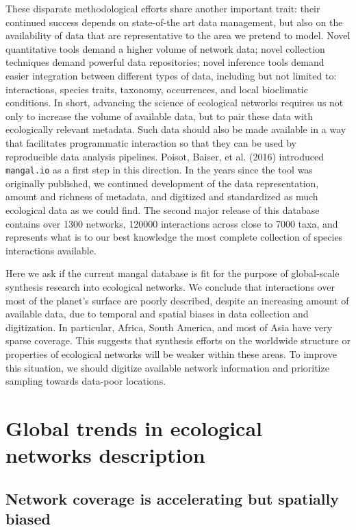 \documentclass[11pt]{article}
\begin{document}
These disparate methodological efforts share another important trait:
their continued success depends on state-of-the art data management, but
also on the availability of data that are representative to the area we
pretend to model. Novel quantitative tools demand a higher volume of
network data; novel collection techniques demand powerful data
repositories; novel inference tools demand easier integration between
different types of data, including but not limited to: interactions,
species traits, taxonomy, occurrences, and local bioclimatic conditions.
In short, advancing the science of ecological networks requires us not
only to increase the volume of available data, but to pair these data
with ecologically relevant metadata. Such data should also be made
available in a way that facilitates programmatic interaction so that
they can be used by reproducible data analysis pipelines. Poisot,
Baiser, et al. (2016) introduced \texttt{mangal.io} as a first step in
this direction. In the years since the tool was originally published, we
continued development of the data representation, amount and richness of
metadata, and digitized and standardized as much ecological data as we
could find. The second major release of this database contains over 1300
networks, 120000 interactions across close to 7000 taxa, and represents
what is to our best knowledge the most complete collection of species
interactions available.

Here we ask if the current mangal database is fit for the purpose of
global-scale synthesis research into ecological networks. We conclude
that interactions over most of the planet's surface are poorly
described, despite an increasing amount of available data, due to
temporal and spatial biases in data collection and digitization. In
particular, Africa, South America, and most of Asia have very sparse
coverage. This suggests that synthesis efforts on the worldwide
structure or properties of ecological networks will be weaker within
these areas. To improve this situation, we should digitize available
network information and prioritize sampling towards data-poor locations.

\hypertarget{global-trends-in-ecological-networks-description}{%
\section{Global trends in ecological networks
description}\label{global-trends-in-ecological-networks-description}}

\hypertarget{network-coverage-is-accelerating-but-spatially-biased}{%
\subsection{Network coverage is accelerating but spatially
biased}\label{network-coverage-is-accelerating-but-spatially-biased}}
\end{document}
